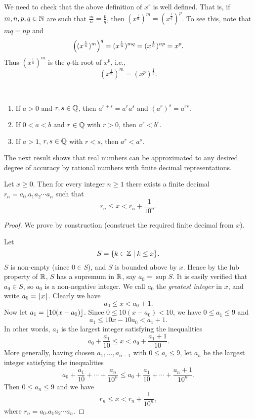 We need to check that the above definition of $x^r$ is well defined. That is, if $m,n,p,q\in\mathbb N$ are such that $\frac{m}{n}=\frac{p}{q}$, then $(x^\frac{1}{n})^m=(x^\frac{1}{q})^p$. 
To see this, note that $mq=np$ and
\[\left((x^\frac{1}{n})^m\right)^q=(x^\frac{1}{n})^{mq}=(x^\frac{1}{n})^{np}=x^p.\]
Thus $(x^\frac{1}{n})^m$ is the $q$-th root of $x^p$, i.e.,
\[(x^\frac{1}{n})^m=(x^p)^\frac{1}{q}.\]

\begin{lemma} \
\begin{enumerate}[label=(\roman*)]
\item If $a>0$ and $r,s\in\mathbb Q$, then $a^{r+s}=a^r a^s$ and $(a^r)^s=a^{rs}$.
\item If $0<a<b$ and $r\in\mathbb Q$ with $r>0$, then $a^r<b^r$.
\item If $a>1$, $r,s\in\mathbb Q$ with $r<s$, then $a^r<a^s$.
\end{enumerate}
\end{lemma}

The next result shows that real numbers can be approximated to any desired degree of accuracy by rational numbers with finite decimal representations.

\begin{proposition}
Let $x\ge0$. Then for every integer $n\ge1$ there exists a finite decimal $r_n=a_0.a_1a_2\cdots a_n$ such that
\[r_n\le x<r_n+\frac{1}{10^n}.\]
\end{proposition}

\begin{proof}
We prove by construction (construct the required finite decimal from $x$).

Let
\[S=\{k\in\mathbb Z\mid k\le x\}.\]
$S$ is non-empty (since $0\in S$), and $S$ is bounded above by $x$. Hence by the lub property of $\mathbb R$, $S$ has a supremum in $\mathbb R$, say $a_0=\sup S$. It is easily verified that $a_0\in S$, so $a_0$ is a non-negative integer. We call $a_0$ the \emph{greatest integer} in $x$, and write $a_0=\left\lfloor x \right\rfloor$. Clearly we have
\[a_0\le x<a_0+1.\]
Now let $a_1=\left\lfloor 10(x-a_0) \right\rfloor$. Since $0\le 10(x-a_0)<10$, we have $0\le a_1\le 9$ and
\[a_1\le 10x-10a_0<a_1+1.\]
In other words, $a_1$ is the largest integer satisfying the inequalities
\[a_0+\frac{a_1}{10}\le x<a_0+\frac{a_1+1}{10}.\]
More generally, having chosen $a_1,\dots,a_{n-1}$ with $0\le a_i\le 9$, let $a_n$ be the largest integer satisfying the inequalities
\[a_0+\frac{a_1}{10}+\cdots+\frac{a_n}{10^n}\le a_0+\frac{a_1}{10}+\cdots+\frac{a_n+1}{10^n}.\]
Then $0\le a_n\le 9$ and we have
\[r_n\le x<r_n+\frac{1}{10^n},\]
where $r_n=a_0.a_1a_2\cdots a_n$.
\end{proof}


